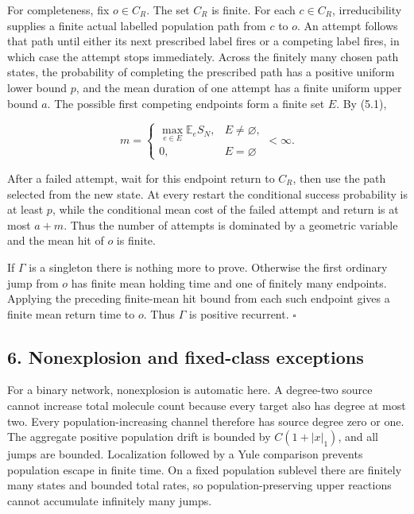 For completeness, fix \(o\in C_R\). The set \(C_R\) is finite. For each
\(c\in C_R\), irreducibility supplies a finite actual labelled
population path from \(c\) to \(o\). An attempt follows that path until
either its next prescribed label fires or a competing label fires, in
which case the attempt stops immediately. Across the finitely many
chosen path states, the probability of completing the prescribed path
has a positive uniform lower bound \(p\), and the mean duration of one
attempt has a finite uniform upper bound \(a\). The possible first
competing endpoints form a finite set \(E\). By (5.1),

\[
 m=\begin{cases}
     \max_{e\in E}{\mathbb E}_eS_N,&E\ne\varnothing,\\
     0,&E=\varnothing
   \end{cases}
 <\infty.                                                          \tag{5.3}
\]

After a failed attempt, wait for this endpoint return to \(C_R\), then
use the path selected from the new state. At every restart the
conditional success probability is at least \(p\), while the conditional
mean cost of the failed attempt and return is at most \(a+m\). Thus the
number of attempts is dominated by a geometric variable and the mean hit
of \(o\) is finite.

If \(\Gamma\) is a singleton there is nothing more to prove. Otherwise
the first ordinary jump from \(o\) has finite mean holding time and one
of finitely many endpoints. Applying the preceding finite-mean hit bound
from each such endpoint gives a finite mean return time to \(o\). Thus
\(\Gamma\) is positive recurrent. \(\square\)

\subsection{6. Nonexplosion and fixed-class
exceptions}

For a binary network, nonexplosion is automatic here. A degree-two
source cannot increase total molecule count because every target also
has degree at most two. Every population-increasing channel therefore
has source degree zero or one. The aggregate positive population drift
is bounded by \(C(1+|x|_1)\), and all jumps are bounded. Localization
followed by a Yule comparison prevents population escape in finite time.
On a fixed population sublevel there are finitely many states and
bounded total rates, so population-preserving upper reactions cannot
accumulate infinitely many jumps.

